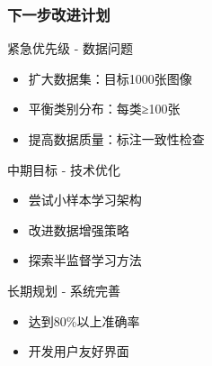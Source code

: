 \documentclass[10pt]{beamer}
\begin{document}
\begin{frame}
\frametitle{下一步改进计划}
\begin{block}{紧急优先级 - 数据问题}
\begin{itemize}
    \item 扩大数据集：目标1000张图像
    \item 平衡类别分布：每类≥100张
    \item 提高数据质量：标注一致性检查
\end{itemize}
\end{block}

\begin{block}{中期目标 - 技术优化}
\begin{itemize}
    \item 尝试小样本学习架构
    \item 改进数据增强策略
    \item 探索半监督学习方法
\end{itemize}
\end{block}

\begin{block}{长期规划 - 系统完善}
\begin{itemize}
    \item 达到80\%以上准确率
    \item 开发用户友好界面
\end{itemize}
\end{block}
\end{frame}
\end{document}
